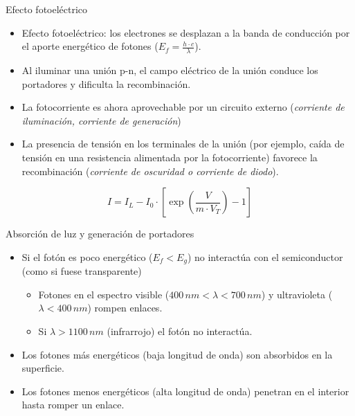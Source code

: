 \documentclass[xcolor={usenames,svgnames,dvipsnames}]{beamer}
\begin{document}
\begin{frame}[label=sec-2-0-2]{Efecto fotoeléctrico}
\begin{itemize}
\item Efecto fotoeléctrico: \alert{los electrones se desplazan a la banda de conducción por el aporte energético de fotones} ($E_{f}=\frac{h\cdot c}{\lambda}$).

\item Al \alert{iluminar una unión p-n}, el \alert{campo eléctrico} de la unión conduce los portadores y \alert{dificulta la recombinación}.

\item La \alert{fotocorriente} es ahora \alert{aprovechable} por un circuito externo (\emph{corriente de iluminación, corriente de generación})

\item La presencia de \alert{tensión en los terminales} de la unión (por ejemplo, caída de tensión en una resistencia alimentada por la fotocorriente) \alert{favorece la recombinación} (\emph{corriente de oscuridad o corriente de diodo}).
\end{itemize}

$$I=I_{L}-I_{0}\cdot[\exp(\frac{V}{m\cdot V_{T}})-1]$$
\end{frame}

\begin{frame}[label=sec-2-0-3]{Absorción de luz y generación de portadores}
\begin{itemize}
\item Si el \alert{fotón es poco energético} ($E_{f}<E_{g}$) \alert{no interactúa con
el semiconductor} (como si fuese transparente)

\begin{itemize}
\item Fotones en el espectro visible ($400\, nm<\lambda<700\, nm$) y
ultravioleta ($\lambda<400\, nm$) rompen enlaces.

\item Si $\lambda>1100\, nm$ (infrarrojo) el fotón no interactúa.
\end{itemize}

\item Los \alert{fotones más energéticos} (baja longitud de onda) son \alert{absorbidos en la superficie}.

\item Los \alert{fotones menos energéticos} (alta longitud de onda) penetran en el interior hasta \alert{romper un enlace}.
\end{itemize}
\end{frame}
\end{document}
